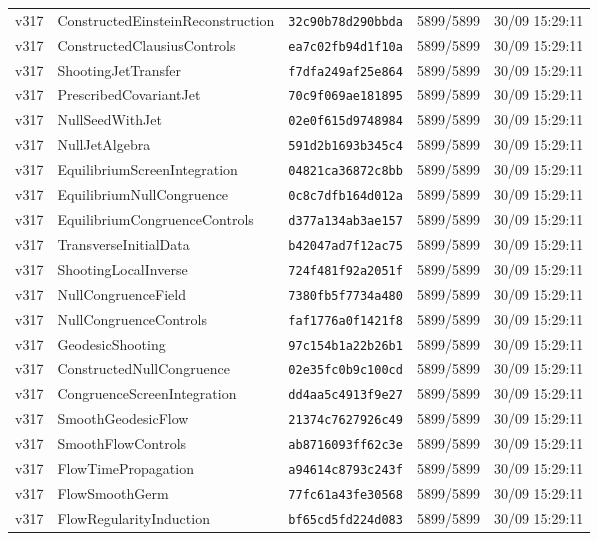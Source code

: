 \documentclass[11pt]{article}
\theoremstyle{definition}\newtheorem{deriv}{Derivação}
\begin{document}
{\begin{longtable}{@{}lllll@{}}
v317 & ConstructedEinsteinReconstruction & \texttt{32c90b78d290bbda} & 5899/5899 & 30/09 15:29:11 \\
v317 & ConstructedClausiusControls & \texttt{ea7c02fb94d1f10a} & 5899/5899 & 30/09 15:29:11 \\
v317 & ShootingJetTransfer & \texttt{f7dfa249af25e864} & 5899/5899 & 30/09 15:29:11 \\
v317 & PrescribedCovariantJet & \texttt{70c9f069ae181895} & 5899/5899 & 30/09 15:29:11 \\
v317 & NullSeedWithJet & \texttt{02e0f615d9748984} & 5899/5899 & 30/09 15:29:11 \\
v317 & NullJetAlgebra & \texttt{591d2b1693b345c4} & 5899/5899 & 30/09 15:29:11 \\
v317 & EquilibriumScreenIntegration & \texttt{04821ca36872c8bb} & 5899/5899 & 30/09 15:29:11 \\
v317 & EquilibriumNullCongruence & \texttt{0c8c7dfb164d012a} & 5899/5899 & 30/09 15:29:11 \\
v317 & EquilibriumCongruenceControls & \texttt{d377a134ab3ae157} & 5899/5899 & 30/09 15:29:11 \\
v317 & TransverseInitialData & \texttt{b42047ad7f12ac75} & 5899/5899 & 30/09 15:29:11 \\
v317 & ShootingLocalInverse & \texttt{724f481f92a2051f} & 5899/5899 & 30/09 15:29:11 \\
v317 & NullCongruenceField & \texttt{7380fb5f7734a480} & 5899/5899 & 30/09 15:29:11 \\
v317 & NullCongruenceControls & \texttt{faf1776a0f1421f8} & 5899/5899 & 30/09 15:29:11 \\
v317 & GeodesicShooting & \texttt{97c154b1a22b26b1} & 5899/5899 & 30/09 15:29:11 \\
v317 & ConstructedNullCongruence & \texttt{02e35fc0b9c100cd} & 5899/5899 & 30/09 15:29:11 \\
v317 & CongruenceScreenIntegration & \texttt{dd4aa5c4913f9e27} & 5899/5899 & 30/09 15:29:11 \\
v317 & SmoothGeodesicFlow & \texttt{21374c7627926c49} & 5899/5899 & 30/09 15:29:11 \\
v317 & SmoothFlowControls & \texttt{ab8716093ff62c3e} & 5899/5899 & 30/09 15:29:11 \\
v317 & FlowTimePropagation & \texttt{a94614c8793c243f} & 5899/5899 & 30/09 15:29:11 \\
v317 & FlowSmoothGerm & \texttt{77fc61a43fe30568} & 5899/5899 & 30/09 15:29:11 \\
v317 & FlowRegularityInduction & \texttt{bf65cd5fd224d083} & 5899/5899 & 30/09 15:29:11 \\

\end{longtable}}
\end{document}
